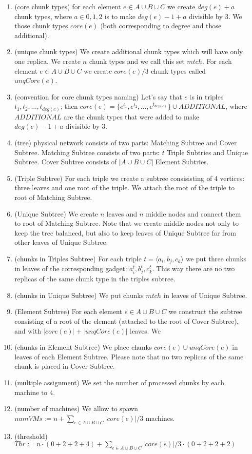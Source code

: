 \begin{enumerate}
  \item (core chunk types) for each element $e \in A\cup B\cup C$ we create
  $deg(e)+a$ chunk types, where $a\in{0,1,2}$ is to make $deg(e)-1+a$
  divisible by 3. We those chunk types $core(e)$ (both corresponding to
  degree and those additional).
  \item (unique chunk types) We create additional chunk types which
  will have only one replica. We create $n$ chunk types and we call
  this set $mtch$. For each element $e\in A\cup B\cup C$ we create $core(e)/3$
  chunk types called $unqCore(e)$.
  \item (convention for core chunk types naming) Let's say that $e$ is in triples
  $t_1,t_2,\ldots,t_{deg(e)}$; then $core(e) = \{ e^{t_1}, e^{t_2},
  \ldots, e^{t_{deg(e)}} \} \cup ADDITIONAL$, where $ADDITIONAL$ are
  the chunk types that were added to make $deg(e)-1+a$ divisible by
  3.
  \item (tree) physical network consists of two parts: Matching Subtree
  and Cover Subtree. Matching Subtree consists of two parts: $t$ Triple
  Subtries and Unique Subtree. Cover Subtree consists of $|A\cup B\cup
  C|$ Element Subtries.
  \item (Triple Subtree) For each triple we create a subtree consisisting of
  4 vertices: three leaves and one root of the triple. We attach the
  root of the triple to root of Matching Subtree.
  \item (Unique Subtree) We create $n$ leaves and $n$ middle nodes and
  connect them to root of Matching Subtree. Note that we create middle
  nodes not only to keep the tree balanced, but also to keep 
  leaves of Unique Subtree far from other leaves of Unique Subtree.
  \item (chunks in Triples Subtree) For each triple
  $t = \langle a_i, b_j, c_k \rangle$ we put three chunks in leaves of
  the corresponding gadget: $a_i^{t}, b_j^{t}, c_k^{t}$. This
  way there are no two replicas of the same chunk type in the triples
  subtree.
  \item (chunks in Unique Subtree) We put chunks $mtch$ in leaves of
  Unique Subtree.
  \item (Element Subtree) For each element $e \in A\cup B\cup C$ we construct the
  subtree consisting of a root of the element (attached to the root of
  Cover Subtree), and with $|core(e)| + |unqCore(e)|$ leaves. We
  \item (chunks in Element Subtree) We place chunks $core(e) \cup
  unqCore(e)$ in leaves of each Element Subtree.
  Please note that no two replicas of the same chunk
  is placed in Cover Subtree.
  \item (multiple assignment) We set the number of processed chunks by
  each machine to 4.
  \item (number of machines) We allow to spawn $numVMs := n + \sum_{e\in A\cup
    B\cup C}|core(e)|/3$ machines.
  \item (threshold) $Thr := n\cdot (0 + 2 + 2 + 4) + \sum_{e\in A\cup
    B\cup C}|core(e)|/3 \cdot (0 + 2 + 2 + 2)$
\end{enumerate}

